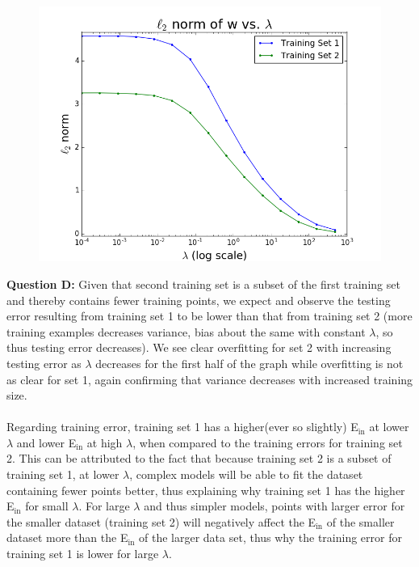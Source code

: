 \documentclass[12 pt]{article}
\begin{document}
	\begin{figure}[H]
	\includegraphics[width=12cm]{l2Norm}
	\end{figure}
	\noindent\textbf{Question D:} Given that second training set is a subset of the first training set and thereby contains fewer training points, we expect and observe the testing error resulting from training set 1 to be lower than that from training set 2 (more training examples decreases variance, bias about the same with constant $\lambda$, so thus testing error decreases). We see clear overfitting for set 2 with increasing testing error as $\lambda$ decreases for the first half of the graph while overfitting is not as clear for set 1, again confirming that variance decreases with increased training size. \\\\Regarding training error, training set 1 has a higher(ever so slightly) E$_\text{in}$ at lower $\lambda$ and lower E$_\text{in}$ at high $\lambda$, when compared to the training errors for training set 2. This can be attributed to the fact that because training set 2 is a subset of training set 1, at lower $\lambda$, complex models will be able to fit the dataset containing fewer points better, thus explaining why training set 1 has the higher E$_\text{in}$ for small $\lambda$. For large $\lambda$ and thus simpler models, points with larger error for the smaller dataset (training set 2) will negatively affect the E$_\text{in}$ of the smaller dataset more than the E$_\text{in}$ of the larger data set, thus why the training error for training set 1 is lower for large $\lambda$.\\
	
\end{document}
